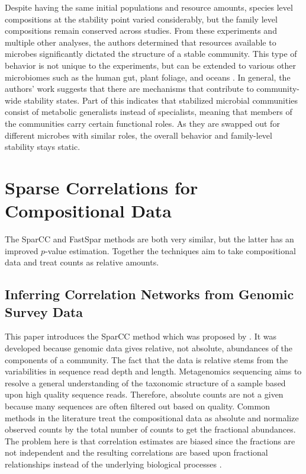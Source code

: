 Despite having the same initial populations and resource amounts, species level compositions at the stability point varied considerably, but the family level compositions remain conserved across studies. From these experiments and multiple other analyses, the authors determined that resources available to microbes significantly dictated the structure of a stable community. This type of behavior is not unique to the experiments, but can be extended to various other microbiomes such as the human gut, plant foliage, and oceans \citep{Goldford2018}. In general, the authors' work suggests that there are mechanisms that contribute to community-wide stability states. Part of this indicates that stabilized microbial communities consist of metabolic generalists instead of specialists, meaning that members of the communities carry certain functional roles. As they are swapped out for different microbes with similar roles, the overall behavior and family-level stability stays static.


\section{Sparse Correlations for Compositional Data}\label{lit-fastcc}

The \acrfull{SparCC} and \acrfull{FastSpar} methods are both very similar, but the latter has an improved $p$-value estimation. Together the techniques aim to take compositional data and treat counts as relative amounts. 

\subsection{Inferring Correlation Networks from Genomic Survey Data} \label{lit-sparcc}
This paper introduces the \acrshort{SparCC} method which was proposed by \citet{Friedman2012}. It was developed because genomic data gives relative, not absolute, abundances of the components of a community. The fact that the data is relative stems from the variabilities in sequence read depth and length. Metagenomics sequencing aims to resolve a general understanding of the taxonomic structure of a sample based upon high quality sequence reads. Therefore, absolute counts are not a given because many sequences are often filtered out based on quality. Common methods in the literature treat the compositional data as absolute and normalize observed counts by the total number of counts to get the fractional abundances. The problem here is that correlation estimates are biased since the fractions are not independent \citep{Buccianti2006} and the resulting correlations are based upon fractional relationships instead of the underlying biological processes \citep{Aitchison2003a,Friedman2012}.


